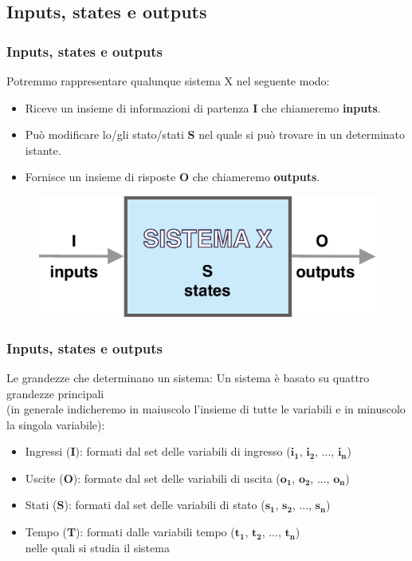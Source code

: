 \subsection[Inputs, states e outputs]{Inputs, states e outputs}

\begin{frame}
	\frametitle{Inputs, states e outputs}
	
	\begin{block}{Potremmo rappresentare qualunque sistema X nel seguente modo:}
		\begin{itemize}
			\item Riceve un insieme di informazioni di partenza \textbf{I} che chiameremo \textbf{inputs}.
			\item Può modificare lo/gli stato/stati \textbf{S} nel quale si può trovare in un determinato istante.
			\item Fornisce un insieme di risposte \textbf{O} che chiameremo \textbf{outputs}.
		\end{itemize}
		
		\begin{figure}[!htbp]
			\centering
			\includegraphics[width=0.55\linewidth]{images/1_i_sistemi/sistemaX.pdf}
		\end{figure}
		\vspace{0.4em}
	\end{block}
\end{frame}


\begin{frame}
	\frametitle{Inputs, states e outputs}
	
	\begin{block}{Le grandezze che determinano un sistema:}
		Un sistema è basato su quattro grandezze principali\\
		(in generale indicheremo in maiuscolo l’insieme di tutte le variabili e in minuscolo la singola variabile):\vspace{1em}
		\begin{itemize}
			\item Ingressi ($\pmb{I}$): formati dal set delle variabili di ingresso ($\pmb{i_1}$, $\pmb{i_2}$, ..., $\pmb{i_n}$)
			\item Uscite ($\pmb{O}$): formate dal set delle variabili di uscita ($\pmb{o_1}$, $\pmb{o_2}$, ..., $\pmb{o_n}$)
			\item Stati ($\pmb{S}$): formati dal set delle variabili di stato ($\pmb{s_1}$, $\pmb{s_2}$, ..., $\pmb{s_n}$)
			\item Tempo ($\pmb{T}$): formati dalle variabili tempo ($\pmb{t_1}$, $\pmb{t_2}$, ..., $\pmb{t_n}$)\\nelle quali si studia il sistema
		\end{itemize}
	\end{block}
\end{frame}


